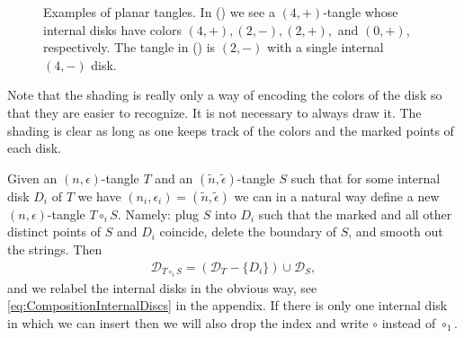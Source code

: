 \begin{figure}[!htp]
\begin{subfigure}{.49\textwidth}
		\caption[]{}\label{subfig:CondExp Neg}
	\end{subfigure}
\caption[First examples of planar tangles]{Examples of planar tangles. In () we see a $(4,+)$-tangle whose internal disks have colors $(4,+),(2,-),(2,+),$ and $(0,+)$, respectively. The tangle in () is $(2,-)$ with a single internal $(4,-)$ disk.}\label{fig:Tangle Examples1}
\end{figure}

Note that the shading is really only a way of encoding the colors of the disk so that they are easier to recognize. It is not necessary to always draw it. The shading is clear as long as one keeps track of the colors and the marked points of each disk.

\bigno Given an $(n,\epsilon)$-tangle $T$ and an $(\tilde{n},\tilde{\epsilon})$-tangle $S$ such that for some internal disk $D_i$ of $T$ we have $(n_i, \epsilon_i)=(\tilde{n},\tilde{\epsilon})$ we can in a natural way define a new $(n,\epsilon)$-tangle $T\circ_i S$. Namely: plug $S$ into $D_i$ such that the marked and all other distinct points of $S$ and $D_i$ coincide, delete the boundary of $S$, and smooth out the strings. Then 
\begin{align*}
\mathcal{D}_{T\circ_i S} = \left(\mathcal{D}_T- \{D_i\}\right) \cup \mathcal{D}_S,
\end{align*}
and we relabel the internal disks in the obvious way, see \eqref{eq:CompositionInternalDiscs} in the appendix. If there is only one internal disk in which we can insert then we will also drop the index and write $\circ$ instead of $\circ_1$.

